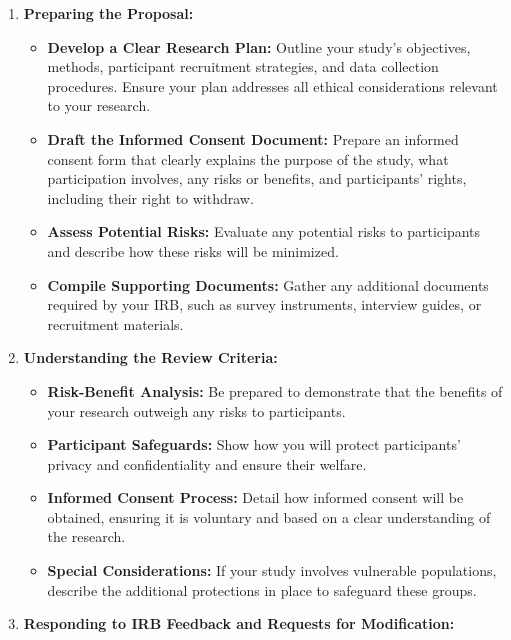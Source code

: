 \documentclass[
]{book}
\providecommand{\tightlist}{%
  \setlength{\itemsep}{0pt}\setlength{\parskip}{0pt}}
\begin{document}
\begin{enumerate}
\def\labelenumi{\arabic{enumi}.}
\tightlist
\item
  \textbf{Preparing the Proposal:}

  \begin{itemize}
  \tightlist
  \item
    \textbf{Develop a Clear Research Plan:} Outline your study's objectives, methods, participant recruitment strategies, and data collection procedures. Ensure your plan addresses all ethical considerations relevant to your research.
  \item
    \textbf{Draft the Informed Consent Document:} Prepare an informed consent form that clearly explains the purpose of the study, what participation involves, any risks or benefits, and participants' rights, including their right to withdraw.
  \item
    \textbf{Assess Potential Risks:} Evaluate any potential risks to participants and describe how these risks will be minimized.
  \item
    \textbf{Compile Supporting Documents:} Gather any additional documents required by your IRB, such as survey instruments, interview guides, or recruitment materials.
  \end{itemize}
\item
  \textbf{Understanding the Review Criteria:}

  \begin{itemize}
  \tightlist
  \item
    \textbf{Risk-Benefit Analysis:} Be prepared to demonstrate that the benefits of your research outweigh any risks to participants.
  \item
    \textbf{Participant Safeguards:} Show how you will protect participants' privacy and confidentiality and ensure their welfare.
  \item
    \textbf{Informed Consent Process:} Detail how informed consent will be obtained, ensuring it is voluntary and based on a clear understanding of the research.
  \item
    \textbf{Special Considerations:} If your study involves vulnerable populations, describe the additional protections in place to safeguard these groups.
  \end{itemize}
\item
  \textbf{Responding to IRB Feedback and Requests for Modification:}


\end{enumerate}
\end{document}
